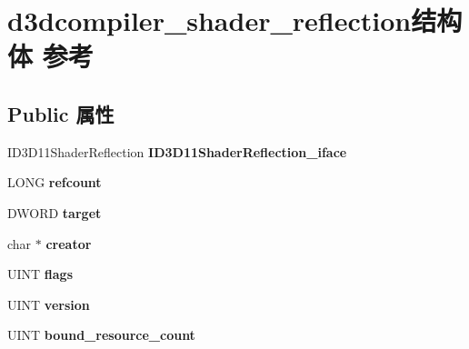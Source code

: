 \hypertarget{structd3dcompiler__shader__reflection}{}\section{d3dcompiler\+\_\+shader\+\_\+reflection结构体 参考}
\label{structd3dcompiler__shader__reflection}
\subsection*{Public 属性}
\begin{DoxyCompactItemize}
\item 
\mbox{\label{structd3dcompiler__shader__reflection_a51c487511f1940ea6c99a55ace8d8b57}} 
I\+D3\+D11\+Shader\+Reflection {\bfseries I\+D3\+D11\+Shader\+Reflection\+\_\+iface}
\item 
\mbox{\label{structd3dcompiler__shader__reflection_a28d3aad804b9a30b9be8211d2305961b}} 
L\+O\+NG {\bfseries refcount}
\item 
\mbox{\label{structd3dcompiler__shader__reflection_a724b6087f7516d9fd39f2b8608e9fa0b}} 
D\+W\+O\+RD {\bfseries target}
\item 
\mbox{\label{structd3dcompiler__shader__reflection_a74aae5caf15c48c653326e7a9a8f14c4}} 
char $\ast$ {\bfseries creator}
\item 
\mbox{\label{structd3dcompiler__shader__reflection_ade551340abc6f7f18f32993ce57c9e66}} 
U\+I\+NT {\bfseries flags}
\item 
\mbox{\label{structd3dcompiler__shader__reflection_a4ce1ed8b6a1e3912286c69d617d174ab}} 
U\+I\+NT {\bfseries version}
\item 
\mbox{\label{structd3dcompiler__shader__reflection_a5e7093ecf0cc78fd6b51c0cf1d8dd7fe}} 
U\+I\+NT {\bfseries bound\+\_\+resource\+\_\+count}
\item 
\mbox{\label{structd3dcompiler__shader__reflection_a3b85cd30a4d97816550b3e7d20e8ede2}} 

\end{DoxyCompactItemize}

